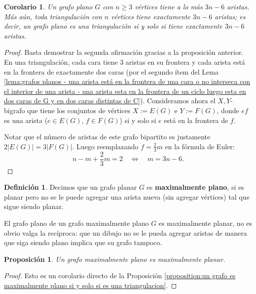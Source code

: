 \documentclass[12pt]{report}
\theoremstyle{plain}
\newtheorem{proposition}[theorem]{Proposición}
\newtheorem{corollary}[theorem]{Corolario}
\theoremstyle{definition}
\newtheorem{definition}[theorem]{Definición}
\newcommand{\abs}[1]{\left \vert #1 \right \vert}
\begin{document}
\begin{corollary}\label{corolario:un grafo plano con n > 2 vertices tiene a lo mas 3n - 6 aristas}
Un grafo plano $G$ con $n \geq 3$ vértices tiene a lo más $3n - 6$ aristas. Más aún, toda triangulación con $n$ vértices tiene exactamente $3n-6$ aristas; es decir, un grafo plano es una triangulación si y solo si tiene exactamente $3n-6$ aristas.
\end{corollary}
\begin{proof}
Basta demostrar la segunda afirmación gracias a la proposición anterior. En una triangulación, cada cara tiene $3$ aristas en su frontera y cada arista está en la frontera de exactamente dos caras (por el segundo ítem del Lema \ref{lema:grafos planos - una arista está en la frontera de una cara o no interseca con el interior de una arista - una arista esta en la frontera de un ciclo luego esta en dos caras de G y en dos caras distintas de C}). Consideramos ahora el $X,Y$-bigrafo que tiene los conjuntos de vértices $X := E(G)$ e $Y := F (G)$, donde $ef$ es una arista ($e \in E(G)$, $f \in F (G)$) si y solo si $e$ está en la frontera de $f$.


Notar que el número de aristas de este grafo bipartito es justamente $2 \abs {E(G)} = 3 \abs{F(G)}$. Luego reemplazando $f = \frac 2 3 m$ en la fórmula de Euler:
\[
    n - m + \frac 2 3 m = 2 \quad \Leftrightarrow \quad m = 3 n - 6.
\]
\end{proof}

\begin{definition}
Decimos que un grafo planar $G$ es \textbf{maximalmente plano}, si es planar pero no se le puede agregar una arista nueva (sin agregar vértices) tal que sigue siendo planar.
\end{definition}

El grafo plano de un grafo maximalmente plano $G$ es maximalmente planar, no es obvio valga la recíproca: que un dibujo no se le pueda agregar aristas de manera que siga siendo plano implica que su grafo tampoco.

\begin{proposition}\label{proposition:grafo es maximalmente plano si y solo si es maximalpmente planar}
Un grafo maximalmente plano es maximalmente planar.
\end{proposition}
\begin{proof}
Esto es un corolario directo de la Proposición \ref{proposition:un grafo es maximalmente plano si y solo si es una triangulacion}.
\end{proof}
\end{document}

